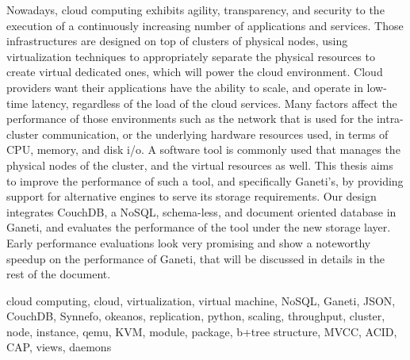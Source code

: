 \begin{abstracteng}

Nowadays, cloud computing exhibits agility, transparency, and security to the
execution of a continuously increasing number of applications and services.
Those infrastructures are designed on top of clusters of physical nodes, using
virtualization techniques to appropriately separate the physical resources to
create virtual dedicated ones, which will power the cloud environment. Cloud
providers want their applications have the ability to scale, and operate in
low-time latency, regardless of the load of the cloud services. Many factors
affect the performance of those environments such as the network that is used
for the intra-cluster communication, or the underlying hardware resources used,
in terms of CPU, memory, and disk i/o. A software tool is commonly used that
manages the physical nodes of the cluster, and the virtual resources as well.
This thesis aims to improve the performance of such a tool, and specifically
Ganeti's, by providing support for alternative engines to serve its storage
requirements. Our design integrates CouchDB, a NoSQL, schema-less, and document
oriented database in Ganeti, and evaluates the performance of the tool under
the new storage layer. Early performance evaluations look very promising and
show a noteworthy speedup on the performance of Ganeti, that will be discussed
in details in the rest of the document.

\begin{keywordseng}
cloud computing, cloud, virtualization, virtual machine, NoSQL, Ganeti, JSON,
CouchDB, Synnefo, okeanos, replication, python, scaling, throughput, cluster,
node, instance, qemu, KVM, module, package, b+tree structure, MVCC, ACID, CAP,
views, daemons
\end{keywordseng}

\end{abstracteng}

